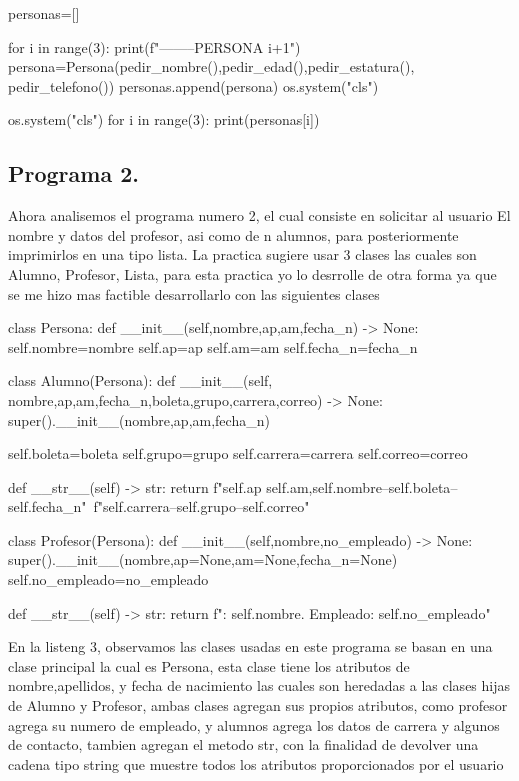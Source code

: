 \documentclass[12pt]{article}
\begin{document}
\begin{python}[caption=Carga de valores e impresion de resultados,label=python_example]
personas=[]

for i in range(3):
    print(f"--------PERSONA {i+1}")
    persona=Persona(pedir_nombre(),pedir_edad(),pedir_estatura(), pedir_telefono())
    personas.append(persona)
    os.system("cls")

os.system("cls")   
for i in range(3):
    print(personas[i])


\end{python}

\subsection{Programa 2.}
Ahora analisemos el programa numero 2, el cual consiste en solicitar al usuario El nombre y datos del profesor, asi como de n alumnos, para posteriormente imprimirlos en una tipo lista. La practica sugiere usar 3 clases las cuales son Alumno, Profesor, Lista, para esta practica yo lo desrrolle de otra forma ya que se me hizo mas factible desarrollarlo con las siguientes clases

\begin{python}[caption=Clases utilizadas en esta practica,label=python_example]
class Persona:
    def __init__(self,nombre,ap,am,fecha_n) -> None:
        self.nombre=nombre
        self.ap=ap
        self.am=am
        self.fecha_n=fecha_n

class Alumno(Persona):
    def __init__(self, nombre,ap,am,fecha_n,boleta,grupo,carrera,correo) -> None:
        super().__init__(nombre,ap,am,fecha_n)

        self.boleta=boleta
        self.grupo=grupo
        self.carrera=carrera
        self.correo=correo

    def __str__(self) -> str:
        return f"{self.ap} {self.am},{self.nombre}--{self.boleta}--{self.fecha_n}\n"\
        f"{self.carrera}--{self.grupo}--{self.correo}"

class Profesor(Persona):
    def __init__(self,nombre,no_empleado) -> None:
        super().__init__(nombre,ap=None,am=None,fecha_n=None)
        self.no_empleado=no_empleado

    def __str__(self) -> str:
        return f"\n\nProfesor:  {self.nombre}\nNo. Empleado: {self.no_empleado}"

\end{python}
En la listeng 3, observamos las clases usadas en este programa se basan en una clase principal la cual es Persona, esta clase tiene los atributos de nombre,apellidos, y fecha de nacimiento las cuales son heredadas a las clases hijas de Alumno y Profesor, ambas clases agregan sus propios atributos, como profesor agrega su numero de empleado, y alumnos agrega los datos de carrera y algunos de contacto, tambien agregan el metodo str, con la finalidad de devolver una cadena tipo string que muestre todos los atributos proporcionados por el usuario\\
\end{document}
